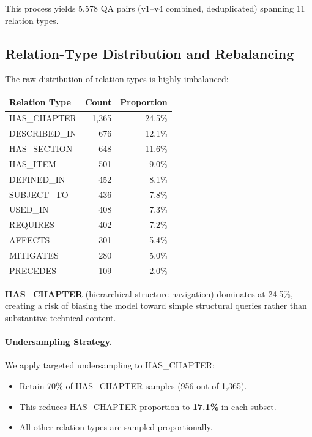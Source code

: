 \documentclass[twocolumn]{article}
\begin{document}
This process yields 5,578 QA pairs (v1--v4 combined, deduplicated) spanning 11 relation types.

\subsection{Relation-Type Distribution and Rebalancing}

The raw distribution of relation types is highly imbalanced:

\begin{center}
\small
\begin{tabular}{lrr}
\toprule
\textbf{Relation Type} & \textbf{Count} & \textbf{Proportion} \\
\midrule
HAS\_CHAPTER     & 1,365 & 24.5\% \\
DESCRIBED\_IN    &   676 & 12.1\% \\
HAS\_SECTION     &   648 & 11.6\% \\
HAS\_ITEM        &   501 &  9.0\% \\
DEFINED\_IN      &   452 &  8.1\% \\
SUBJECT\_TO      &   436 &  7.8\% \\
USED\_IN         &   408 &  7.3\% \\
REQUIRES         &   402 &  7.2\% \\
AFFECTS          &   301 &  5.4\% \\
MITIGATES        &   280 &  5.0\% \\
PRECEDES         &   109 &  2.0\% \\
\bottomrule
\end{tabular}
\end{center}

\textbf{HAS\_CHAPTER} (hierarchical structure navigation) dominates at 24.5\%, creating
a risk of biasing the model toward simple structural queries rather than substantive
technical content.

\paragraph{Undersampling Strategy.}
We apply targeted undersampling to HAS\_CHAPTER:
\begin{itemize}
  \item Retain 70\% of HAS\_CHAPTER samples (956 out of 1,365).
  \item This reduces HAS\_CHAPTER proportion to \textbf{17.1\%} in each subset.
  \item All other relation types are sampled proportionally.
\end{itemize}
\end{document}
